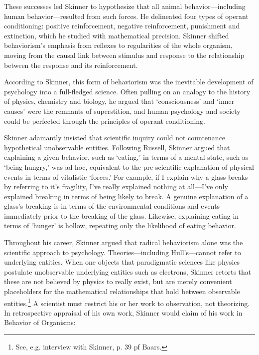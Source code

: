\begin{refsection}
These successes led Skinner to hypothesize that all animal behavior---including human behavior---resulted from such forces. He delineated four types of operant conditioning: positive reinforcement, negative reinforcement, punishment and extinction, which he studied with mathematical precision. Skinner shifted behaviorism's emphasis from reflexes to regularities of the whole organism, moving from the causal link between stimulus and response to the relationship between the response and its reinforcement.

According to Skinner, this form of behaviorism was the inevitable development of psychology into a full-fledged science. Often pulling on an analogy to the history of physics, chemistry and biology, he argued that `consciousness' and `inner causes' were the remnants of superstition, and human psychology and society could be perfected through the principles of operant conditioning. 

Skinner adamantly insisted that scientific inquiry could not countenance hypothetical unobservable entities. Following Russell, Skinner argued that explaining a given behavior, such as `eating,' in terms of a mental state, such as `being hungry,' was ad hoc, equivalent to the pre-scientific explanation of physical events in terms of vitalistic `forces.' For example, if I explain why a glass breaks by referring to it's fragility, I've really explained nothing at all---I've only explained breaking in terms of being likely to break. A genuine explanation of a glass's breaking is in terms of the environmental conditions and events immediately prior to the breaking of the glass. Likewise, explaining eating in terms of `hunger' is hollow, repeating only the likelihood of eating behavior.

Throughout his career, Skinner argued that radical behaviorism alone was the scientific approach to psychology. Theories---including Hull's---cannot refer to underlying entities. When one objects that paradigmatic sciences like physics postulate unobservable underlying entities such as electrons, Skinner retorts that these are not believed by physics to really exist, but are merely convenient placeholders for the mathematical relationships that hold between observable entities.\footnote{See, e.g. interview with Skinner, p. 39 pf Baars.} A scientist must restrict his or her work to observation, not theorizing. In retrospective appraisal of his own work, Skinner would claim of his work in Behavior of Organisms:

\begin{quote}


\end{quote}
\end{refsection}
